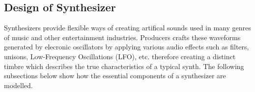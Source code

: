 \subsection{Design of Synthesizer}
\label{sec:synthesizer}

Synthesizers provide flexible ways of creating artifical sounds used in many genres of music
and other entertainment industries. Producers crafts these waveforms generated by elecronic 
oscillators by applying various audio effects such as filters, unisons, Low-Frequency Oscillations
(LFO), etc. therefore creating a distinct timbre which describes the true characteristics
of a typical synth. The following subsections below show how the essential components of a synthesizer
are modelled.



\pagebreak


